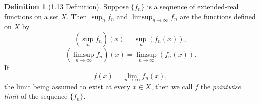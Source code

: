 \documentclass[12pt]{article}
\theoremstyle{definition} %
\newtheorem{definition}{Definition}
\theoremstyle{plain} %
\begin{document}
\begin{definition}[1.13 Definition]
      Suppose $\{f_n\}$ is a sequence of extended-real functions on a set $X$. Then $\sup_n f_n$ and $\limsup_{n \to \infty} f_n$ are the functions defined on $X$ by
      \begin{equation}
          \left(\sup_n f_n\right)(x) = \sup_n (f_n(x)),
      \end{equation}
      \begin{equation}
          \left(\limsup_{n \to \infty} f_n\right)(x) = \limsup_{n \to \infty} (f_n(x)).
      \end{equation}
      If
      \begin{equation}
          f(x) = \lim_{n \to \infty} f_n(x),
      \end{equation}
      the limit being assumed to exist at every $x \in X$, then we call $f$ the \textit{pointwise limit} of the sequence $\{f_n\}$.
      \end{definition}
\end{document}
